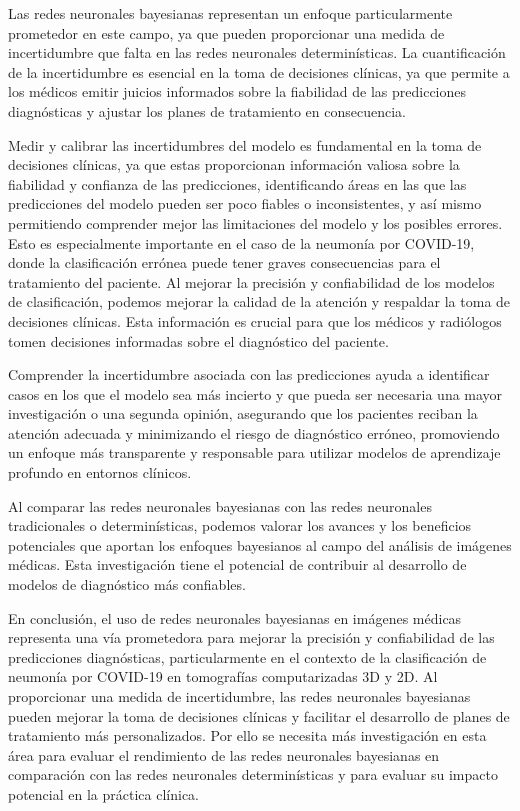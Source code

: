 \documentclass[10pt, oneside, a4paper]{article}
\begin{document}
	Las redes neuronales bayesianas representan un enfoque particularmente prometedor en este campo, ya que pueden proporcionar una medida de incertidumbre que falta en las redes neuronales determinísticas. La cuantificación de la incertidumbre es esencial en la toma de decisiones clínicas, ya que permite a los médicos emitir juicios informados sobre la fiabilidad de las predicciones diagnósticas y ajustar los planes de tratamiento en consecuencia. 
	
	
	Medir y calibrar las incertidumbres del modelo es fundamental en la toma de decisiones clínicas, ya que estas proporcionan información valiosa sobre la fiabilidad y confianza de las predicciones, identificando áreas en las que las predicciones del modelo pueden ser poco fiables o inconsistentes, y así mismo permitiendo comprender mejor las limitaciones del modelo y los posibles errores. Esto es especialmente importante en el caso de la neumonía por COVID-19, donde la clasificación errónea puede tener graves consecuencias para el tratamiento del paciente. Al mejorar la precisión y confiabilidad de los modelos de clasificación, podemos mejorar la calidad de la atención y respaldar la toma de decisiones clínicas. Esta información es crucial para que los médicos y radiólogos tomen decisiones informadas sobre el diagnóstico del paciente. 
	
	Comprender la incertidumbre asociada con las predicciones ayuda a identificar casos en los que el modelo sea más incierto y que pueda ser necesaria una mayor investigación o una segunda opinión, asegurando que los pacientes reciban la atención adecuada y minimizando el riesgo de diagnóstico erróneo, promoviendo un enfoque más transparente y responsable para utilizar modelos de aprendizaje profundo en entornos clínicos.
		
	Al comparar las redes neuronales bayesianas con las redes neuronales tradicionales o determinísticas, podemos valorar los avances y los beneficios potenciales que aportan los enfoques bayesianos al campo del análisis de imágenes médicas. Esta investigación tiene el potencial de contribuir al desarrollo de modelos de diagnóstico más confiables.
	
	En conclusión, el uso de redes neuronales bayesianas en imágenes médicas representa una vía prometedora para mejorar la precisión y confiabilidad de las predicciones diagnósticas, particularmente en el contexto de la clasificación de neumonía por COVID-19 en tomografías computarizadas 3D y 2D. Al proporcionar una medida de incertidumbre, las redes neuronales bayesianas pueden mejorar la toma de decisiones clínicas y facilitar el desarrollo de planes de tratamiento más personalizados. Por ello se necesita más investigación en esta área para evaluar el rendimiento de las redes neuronales bayesianas en comparación con las redes neuronales determinísticas y para evaluar su impacto potencial en la práctica clínica.
	
\end{document}
